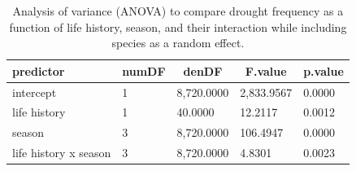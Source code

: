 \documentclass[man,floatsintext]{apa6}
\theoremstyle{definition}
\theoremstyle{definition}
\theoremstyle{definition}
\theoremstyle{remark}
\begin{document}
\begin{table}[tbp]
\begin{center}
\begin{threeparttable}
\caption{\label{tab:anovatable}Analysis of variance (ANOVA) to compare drought frequency as a function of life history, season, and their interaction while including species as a random effect.}
\begin{tabular}{lllll}
\toprule
predictor & \multicolumn{1}{c}{numDF} & \multicolumn{1}{c}{denDF} & \multicolumn{1}{c}{F.value} & \multicolumn{1}{c}{p.value}\\
\midrule
intercept & 1 & 8,720.0000 & 2,833.9567 & 0.0000\\
life history & 1 & 40.0000 & 12.2117 & 0.0012\\
season & 3 & 8,720.0000 & 106.4947 & 0.0000\\
life history x season & 3 & 8,720.0000 & 4.8301 & 0.0023\\
\bottomrule
\end{tabular}
\end{threeparttable}
\end{center}
\end{table}
\end{document}
